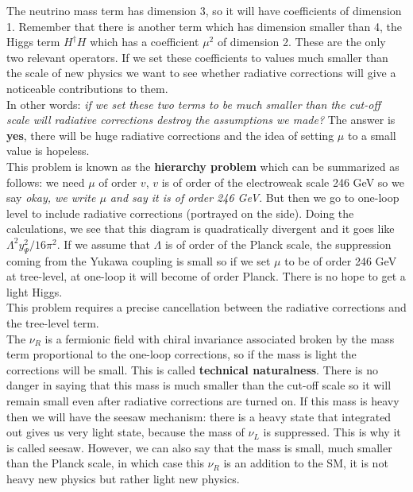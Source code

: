 \documentclass[../main.tex]{subfiles}
\begin{document}
\begin{kaobox}[frametitle=Quick Introduction to the Hierarchy Problem in the Standard Model]
The neutrino mass term has dimension 3, so it will have coefficients of dimension 1. Remember that there is another term which has dimension smaller than 4, the Higgs term $H^\dagger H$ which has a coefficient $\mu^2$ of dimension 2. These are the only two relevant operators. If we set these coefficients to values much smaller than the scale of new physics we want to see whether radiative corrections will give a noticeable contributions to them.\\
In other words: \textit{if we set these two terms to be much smaller than the cut-off scale will radiative corrections destroy the assumptions we made?} The answer is \textbf{yes}, there will be huge radiative corrections and the idea of setting $\mu$ to a small value is hopeless.\\
This problem is known as the \textbf{hierarchy problem} which can be summarized as follows: we need $\mu$ of order $v$, $v$ is of order of the electroweak scale 246 GeV so we say \textit{okay, we write $\mu$ and say it is of order 246 GeV}. But then we go to one-loop level to include radiative corrections (portrayed on the side).
Doing the calculations, we see that this diagram is quadratically divergent and it goes like $\Lambda^2y_\Psi^2/16\pi^2$. If we assume that $\Lambda$ is of order of the Planck scale, the suppression coming from the Yukawa coupling is small so if we set $\mu$ to be of order 246 GeV at tree-level, at one-loop it will become of order Planck. There is no hope to get a light Higgs.\\
This problem requires a precise cancellation between the radiative corrections and the tree-level term.\\
The $\nu_R$ is a fermionic field with chiral invariance associated broken by the mass term proportional to the one-loop corrections, so if the mass is light the corrections will be small. This is called \textbf{technical naturalness}. There is no danger in saying that this mass is much smaller than the cut-off scale so it will remain small even after radiative corrections are turned on. If this mass is heavy then we will have the seesaw mechanism: there is a heavy state that integrated out gives us very light state, because the mass of $\nu_L$ is suppressed. This is why it is called seesaw. However, we can also say that the mass is small, much smaller than the Planck scale, in which case this $\nu_R$ is an addition to the SM, it is not heavy new physics but rather light new physics.
\end{kaobox}
\end{document}
